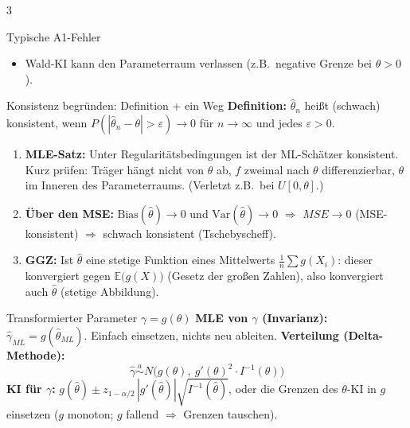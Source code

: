 \documentclass[8pt,a4paper,landscape]{extarticle}
\newcommand{\E}{\mathbb{E}}
\newcommand{\V}{\mathrm{Var}}
\newcommand{\asim}{\overset{a}{\sim}}
\newcommand{\ra}{$\Rightarrow$}
\begin{document}
\begin{multicols*}{3}
\begin{falle}{Typische A1-Fehler}
\begin{itemize}
\item Wald-KI kann den Parameterraum verlassen (z.B.\ negative Grenze bei $\theta>0$).
\end{itemize}
\end{falle}
\begin{rechnen}{Konsistenz begründen: Definition + ein Weg}
\textbf{Definition:} $\hat\theta_n$ heißt (schwach) konsistent, wenn $P(|\hat\theta_n-\theta|>\varepsilon)\to 0$ für $n\to\infty$ und jedes $\varepsilon>0$.
\begin{enumerate}[leftmargin=10pt]
\item \textbf{MLE-Satz:} Unter Regularitätsbedingungen ist der ML-Schätzer konsistent. Kurz prüfen: Träger hängt nicht von $\theta$ ab, $f$ zweimal nach $\theta$ differenzierbar, $\theta$ im Inneren des Parameterraums. (Verletzt z.B.\ bei $U[0,\theta]$.)
\item \textbf{Über den MSE:} $\text{Bias}(\hat\theta)\to 0$ und $\V(\hat\theta)\to 0$ \ra{} $MSE\to 0$ (MSE-konsistent) \ra{} schwach konsistent (Tschebyscheff).
\item \textbf{GGZ:} Ist $\hat\theta$ eine stetige Funktion eines Mittelwerts $\frac1n\sum g(X_i)$: dieser konvergiert gegen $\E\big(g(X)\big)$ (Gesetz der großen Zahlen), also konvergiert auch $\hat\theta$ (stetige Abbildung).
\end{enumerate}
\end{rechnen}
\begin{rechnen}{Transformierter Parameter $\gamma=g(\theta)$}
\textbf{MLE von $\gamma$ (Invarianz):} $\hat\gamma_{ML}=g(\hat\theta_{ML})$. Einfach einsetzen, nichts neu ableiten.
\textbf{Verteilung (Delta-Methode):}
$$\hat\gamma\asim N\Big(g(\theta),\ g'(\theta)^2\cdot I^{-1}(\theta)\Big)$$
\textbf{KI für $\gamma$:} $g(\hat\theta)\pm z_{1-\alpha/2}\,|g'(\hat\theta)|\sqrt{I^{-1}(\hat\theta)}$, oder die Grenzen des $\theta$-KI in $g$ einsetzen ($g$ monoton; $g$ fallend \ra{} Grenzen tauschen).
\end{rechnen}


\end{multicols*}
\end{document}
